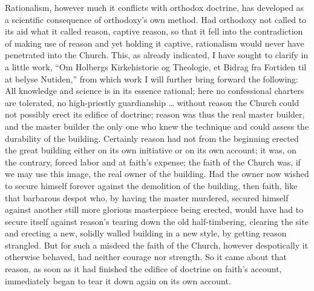 \documentclass[12pt]{book}
\newcommand{\opage}[1]{\marginnote{\footnotesize\textit{[#1]}}}
\begin{document}
Rationalism, however much it conflicts with orthodox doctrine, has developed
as a scientific consequence of orthodoxy's own method. Had orthodoxy not
called to its aid what it called reason, captive reason, so that it fell into
the contradiction of making use of reason and yet holding it captive,
rationalism would never have penetrated into the Church. This, as already
indicated, I have sought to clarify in a little work, ``Om Holbergs
Kirkehistorie og Theologie, et Bidrag fra Fortiden til at belyse Nutiden,''
from which work I will further bring forward the following: All knowledge and
science is in its essence rational; here no confessional charters are
tolerated, no high-priestly guardianship \ldots{} without reason the Church
could not possibly erect its edifice of doctrine; reason was thus the real
master builder, and the master builder the only one who knew the technique
and could assess the durability of the building. Certainly reason had not
from the beginning erected the great building either on its own initiative or
on its own account; it was, on the contrary, forced
\opage{251}\setcounter{footnote}{0}%
labor and at faith's expense; the faith of the Church was, if we may use this
image, the real owner of the building. Had the owner now wished to secure
himself forever against the demolition of the building, then faith, like that
barbarous despot who, by having the master murdered, secured himself against
another still more glorious masterpiece being erected, would have had to
secure itself against reason's tearing down the old half-timbering, clearing
the site and erecting a new, solidly walled building in a new style, by
getting reason strangled. But for such a misdeed the faith of the Church,
however despotically it otherwise behaved, had neither courage nor strength.
So it came about that reason, as soon as it had finished the edifice of
doctrine on faith's account, immediately began to tear it down again on its
own account.
\end{document}
